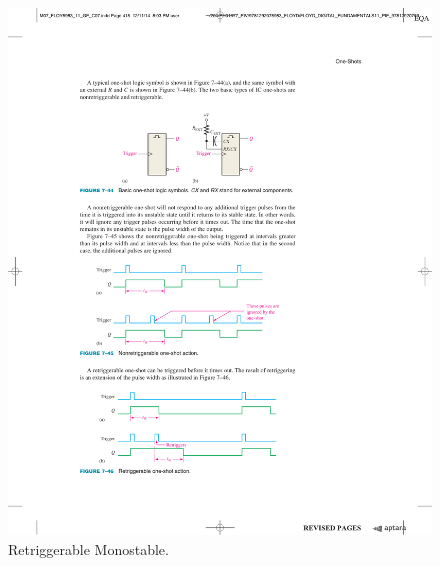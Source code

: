 \documentclass[a4paper, 11pt, oneside]{article}
\begin{document}
\begin{figure}[H]
    \centering
    \includegraphics[scale = 1]{Graphics/Practice 2/GRAPHICS/MONOSTABLE/RETRIGGERABLE.pdf}
    \caption{Retriggerable Monostable. ~\autocite{FLOYD}}
    \label{fig:RETRIGGERABLE}
\end{figure}
\end{document}
